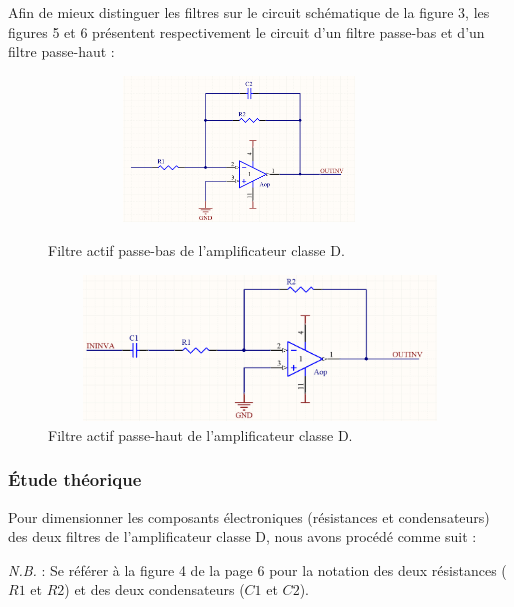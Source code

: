 \documentclass[10pt, oneside, a4paper]{article}
\begin{document}
Afin de mieux distinguer les filtres sur le circuit schématique de la figure 3, les figures 5 et 6 présentent respectivement le circuit d'un filtre passe-bas et d'un filtre passe-haut : 

\begin{figure}[htbp]
    \centering
    \begin{minipage}[c]{.46\linewidth}
        \includegraphics[height=110pt, width=0.9\textwidth]{image/filtre-passe-bas.jpg}
        \caption{Filtre actif passe-bas de l'amplificateur classe D.}   
    \end{minipage} \hfill
    \begin{minipage}[c]{.46\linewidth}
        \includegraphics[height=110pt, width=1.1\textwidth]{image/filtre-passe-haut.jpg}
        \caption{Filtre actif passe-haut de l'amplificateur classe D.}    
    \end{minipage}
\end{figure}

\subsubsection{Étude théorique}
	\label{sec:etudeTheorique}
Pour dimensionner les composants électroniques (résistances et condensateurs) des deux filtres de l'amplificateur classe D, nous avons procédé comme suit : 

\textit{N.B.} : Se référer à la figure 4 de la page 6 pour la notation des deux résistances ($R1$ et $R2$) et des deux condensateurs ($C1$ et $C2$).
\end{document}
